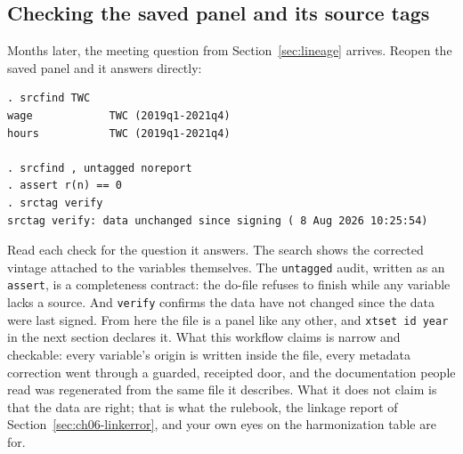 \documentclass[
    a4paper,
    fontsize=10pt,
    twoside=true,
    numbers=noenddot,
]{kaobook}
\begin{document}
\subsection{Checking the saved panel and its source tags}
Months later, the meeting question from Section~\ref{sec:lineage} arrives. Reopen the saved panel and it answers directly:
\par
{\footnotesize
\begin{verbatim}
. srcfind TWC
wage            TWC (2019q1-2021q4)
hours           TWC (2019q1-2021q4)

. srcfind , untagged noreport
. assert r(n) == 0
. srctag verify
srctag verify: data unchanged since signing ( 8 Aug 2026 10:25:54)
\end{verbatim}
}
Read each check for the question it answers. The search shows the corrected vintage attached to the variables themselves. The \texttt{untagged} audit, written as an \texttt{assert}, is a completeness contract: the do-file refuses to finish while any variable lacks a source. And \texttt{verify} confirms the data have not changed since the data were last signed. From here the file is a panel like any other, and \texttt{xtset id year} in the next section declares it. What this workflow claims is narrow and checkable: every variable's origin is written inside the file, every metadata correction went through a guarded, receipted door, and the documentation people read was regenerated from the same file it describes. What it does not claim is that the data are right; that is what the rulebook, the linkage report of Section~\ref{sec:ch06-linkerror}, and your own eyes on the harmonization table are for.
\end{document}
